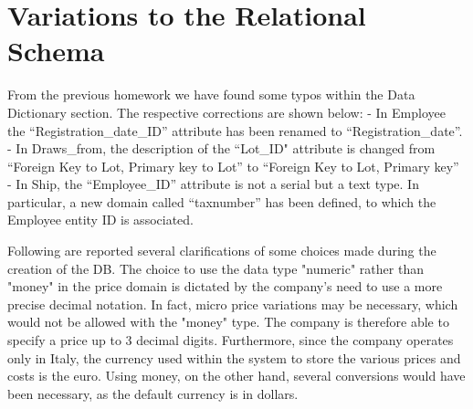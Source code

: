 \section{Variations to the Relational Schema}

From the previous homework we have found some typos within the Data Dictionary section. The respective corrections are shown below:
- In Employee the ``Registration\_date\_ID'' attribute has been renamed to ``Registration\_date''.
- In Draws\_from, the description of the ``Lot\_ID" attribute is changed from ``Foreign Key to Lot, Primary key to Lot'' to ``Foreign Key to Lot, Primary key''
- In Ship, the ``Employee\_ID'' attribute is not a serial but a text type. In particular, a new domain called ``taxnumber'' has been defined, to which the Employee entity ID is associated.

Following are reported several clarifications of some choices made during the creation of the DB. The choice to use the data type "numeric" rather than "money" in the price domain is dictated by the company's need to use a more precise decimal notation. In fact, micro price variations may be necessary, which would not be allowed with the "money" type. The company is therefore able to specify a price up to 3 decimal digits. Furthermore, since the company operates only in Italy, the currency used within the system to store the various prices and costs is the euro. Using money, on the other hand, several conversions would have been necessary, as the default currency is in dollars.